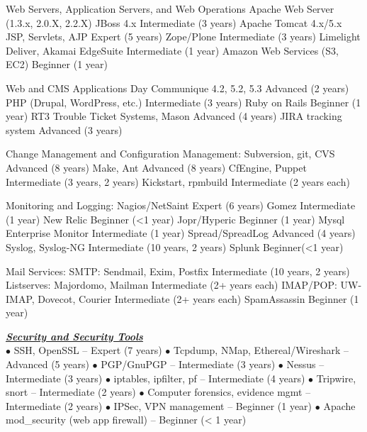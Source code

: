 \documentclass{article}
\newcommand{\skillset}[1]{{ \underline{\textbf{\emph{#1}}}\\  }}
\newcommand{\skill}[2]{{$\bullet$ #1 -- #2}}
\begin{document}
Web Servers, Application Servers, and Web Operations
   Apache Web Server (1.3.x, 2.0.X, 2.2.X)
   JBoss 4.x                                 Intermediate (3 years)
   Apache Tomcat 4.x/5.x
   JSP, Servlets, AJP                        Expert (5 years)
   Zope/Plone                                Intermediate (3 years)
   Limelight Deliver, Akamai EdgeSuite       Intermediate (1 year)
   Amazon Web Services (S3, EC2)             Beginner (1 year)

Web and CMS Applications
   Day Communique 4.2, 5.2, 5.3              Advanced (2 years)
   PHP (Drupal, WordPress, etc.)             Intermediate (3 years)
   Ruby on Rails                             Beginner (1 year)
   RT3 Trouble Ticket Systems, Mason         Advanced (4 years)
   JIRA tracking system                      Advanced (3 years)

Change Management and Configuration Management: 
   Subversion, git, CVS                      Advanced (8 years)
   Make, Ant                                 Advanced (8 years)
   CfEngine, Puppet                          Intermediate (3 years, 2 years)
   Kickstart, rpmbuild                       Intermediate (2 years each)
   
Monitoring and Logging: 
   Nagios/NetSaint                           Expert (6 years)
   Gomez                                     Intermediate (1 year)
   New Relic                                 Beginner (<1 year)
   Jopr/Hyperic                              Beginner (1 year)
   Mysql Enterprise Monitor                  Intermediate (1 year)
   Spread/SpreadLog                          Advanced (4 years)
   Syslog, Syslog-NG                         Intermediate (10 years, 2 years)
   Splunk                                    Beginner(<1 year)

Mail Services:
   SMTP: Sendmail, Exim, Postfix             Intermediate (10 years, 2 years)
   Listserves: Majordomo, Mailman            Intermediate (2+ years each)
   IMAP/POP: UW-IMAP, Dovecot, Courier       Intermediate (2+ years each)
   SpamAssassin                              Beginner (1 year)

\skillset{Security and Security Tools}
\skill{SSH, OpenSSL}{Expert (7 years)}
\skill{Tcpdump, NMap, Ethereal/Wireshark}{Advanced (5 years)}
\skill{PGP/GnuPGP}{Intermediate (3 years)}
\skill{Nessus}{Intermediate (3 years)}
\skill{iptables, ipfilter, pf}{Intermediate (4 years)}
\skill{Tripwire, snort}{Intermediate (2 years)}
\skill{Computer forensics, evidence mgmt}{Intermediate (2 years)}
\skill{IPSec, VPN management}{Beginner (1 year)}
\skill{Apache mod\_security (web app firewall)}{Beginner (< 1 year)}
\end{document}
